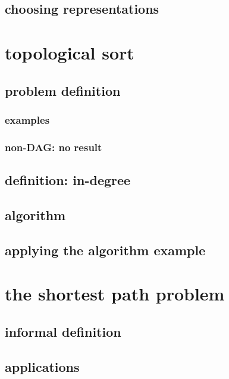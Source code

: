 \subsection{choosing representations}

\section{topological sort}

\subsection{problem definition}

\subsubsection{examples}

\subsubsection{non-DAG: no result}

\subsection{definition: in-degree}

\subsection{algorithm}



\subsection{applying the algorithm example}

\section{the shortest path problem}

\subsection{informal definition}

\subsection{applications}

